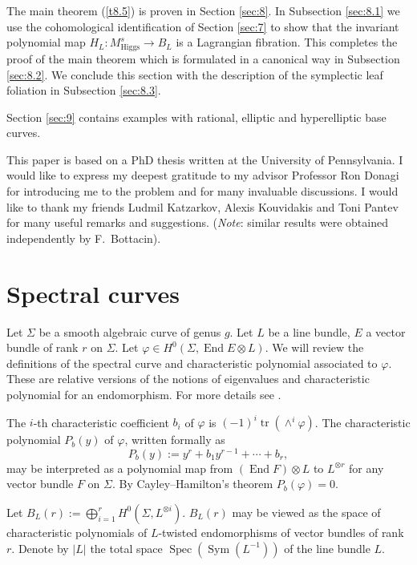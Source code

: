 \documentclass[12pt,a4paper,oneside,english]{smfart}
\theoremstyle{definition}
\theoremstyle{remark}
\DeclareMathOperator{\End}{End}
\DeclareMathOperator{\tr}{tr}
\DeclareMathOperator{\Spec}{Spec}
\DeclareMathOperator{\Sym}{Sym}
\newcommand{\Hig}{\mathrm{Higgs}}
\newcommand{\MHs}{M^{s}_{\Hig}}
\newcommand{\tot}[1]{\lvert #1 \rvert}
\begin{document}
The main theorem (\ref{t8.5}) is proven in Section \ref{sec:8}. In Subsection \ref{sec:8.1} we use the cohomological identification of Section \ref{sec:7} to show that the invariant polynomial map $H_L \colon \MHs \to B_L$ is a Lagrangian fibration. This completes the proof of the main theorem which is formulated in a canonical way in Subsection \ref{sec:8.2}. We conclude this section with the description of the symplectic leaf foliation in Subsection \ref{sec:8.3}.

Section \ref{sec:9} contains examples with rational, elliptic and hyperelliptic base curves.

This paper is based on a PhD thesis written at the University of Pennsylvania. I would like to express my deepest gratitude to my advisor Professor Ron Donagi for introducing me to the problem and for many invaluable discussions. I would like to thank my friends Ludmil Katzarkov, Alexis Kouvidakis and Toni Pantev for many useful remarks and suggestions. (\emph{Note}: similar results were obtained independently by F.~Bottacin).

\section{Spectral curves}\label{sec:2}

Let $\Sigma$ be a smooth algebraic curve of genus $g$. Let $L$ be a line bundle, $E$ a vector bundle of rank $r$ on $\Sigma$. Let $\varphi \in H^0(\Sigma, \End E \otimes L)$. We will review the definitions of the spectral curve and characteristic polynomial associated to $\varphi$. These are relative versions of the notions of eigenvalues and characteristic polynomial for an endomorphism. For more details see \cite{B-N-R}.

The $i$-th characteristic coefficient $b_i$ of $\varphi$ is $(-1)^i \tr(\wedge^i \varphi)$. The characteristic polynomial $P_b(y)$ of $\varphi$, written formally as
\[
P_b(y) := y^r + b_1 y^{r-1} + \cdots + b_r,
\]
may be interpreted as a polynomial map from $(\End F) \otimes L$ to $L^{\otimes r}$ for any vector bundle $F$ on $\Sigma$. By Cayley--Hamilton's theorem $P_b(\varphi) = 0$.

Let $B_L(r) := \bigoplus_{i=1}^{r} H^0(\Sigma, L^{\otimes i})$. $B_L(r)$ may be viewed as the space of characteristic polynomials of $L$-twisted endomorphisms of vector bundles of rank $r$. Denote by $\tot{L}$ the total space $\Spec(\Sym(L^{-1}))$ of the line bundle $L$.
\end{document}
